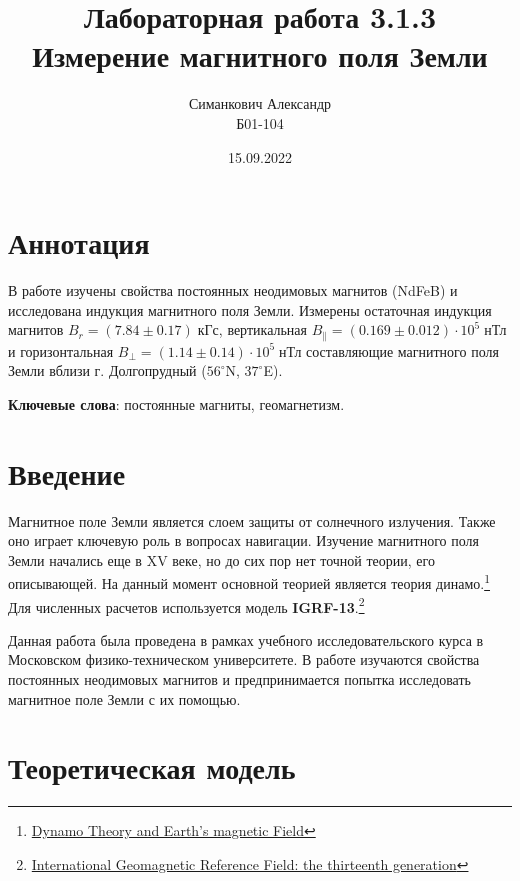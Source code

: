 \documentclass[12pt,a4paper]{article}
\title{Лабораторная работа 3.1.3\\ Измерение магнитного поля Земли}
\author{Симанкович Александр \\ Б01-104}
\date{15.09.2022}
\begin{document}
	\maketitle
	
	\section*{Аннотация}
	
	В работе изучены свойства постоянных неодимовых магнитов (NdFeB) и исследована индукция магнитного поля Земли. Измерены остаточная индукция магнитов $B_r = (7.84 \pm 0.17) \; \text{кГс}$, вертикальная  $B_\parallel = (0.169 \pm 0.012) \cdot 10^5 \; \text{нТл}$ и горизонтальная $ B_{\perp} = (1.14 \pm 0.14) \cdot 10^5 \; \text{нТл}$ составляющие магнитного поля Земли вблизи г. Долгопрудный ($56^\circ$N, $37 ^\circ$E).
	
	\vspace{10pt}
	\noindent\textbf{Ключевые слова}: постоянные магниты, геомагнетизм.
	
	\section*{Введение}
	
	Магнитное поле Земли является слоем защиты от солнечного излучения. Также оно играет ключевую роль в вопросах навигации. Изучение магнитного поля Земли начались еще в XV веке, но до сих пор нет точной теории, его описывающей. На данный момент основной теорией является теория динамо.\footnote{
		\href{https://web.archive.org/web/20070221094040/http://setiathome.berkeley.edu/~pauld/etc/210BPaper.pdf}{Dynamo Theory and Earth's magnetic Field}
	}
	Для численных расчетов используется модель \textbf{IGRF-13}.\footnote{
		\href{https://earth-planets-space.springeropen.com/articles/10.1186/s40623-020-01288-x}
		{International Geomagnetic Reference Field: the thirteenth generation}
	}

	Данная работа была проведена в рамках учебного исследовательского курса в Московском физико-техническом университете. В работе изучаются свойства постоянных неодимовых магнитов и предпринимается попытка исследовать магнитное поле Земли с их помощью.
	
	\section*{Теоретическая модель}
	
\end{document}
